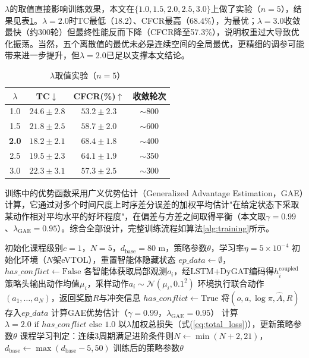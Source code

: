 \documentclass[12pt,a4paper,UTF8]{ctexart}
\begin{document}
$\lambda$的取值直接影响训练效果，本文在$\{1.0, 1.5, 2.0, 2.5, 3.0\}$上做了实验（$n=5$），结果见表\ref{tab:lambda}。$\lambda=2.0$时TC最低（18.2）、CFCR最高（68.4\%），为最优；$\lambda=3.0$收敛最快（约300轮）但最终性能反而下降（CFCR降至57.3\%），说明权重过大导致优化振荡。当然，五个离散值的最优未必是连续空间的全局最优，更精细的调参可能带来进一步提升，但$\lambda=2.0$已足以支撑本文结论。

\begin{table}[H]
    \centering
    \caption{$\lambda$取值实验（$n=5$）}
    \label{tab:lambda}
    \begin{tabular}{|c|c|c|c|}
        \hline
        $\lambda$ & TC$\downarrow$ & CFCR(\%)$\uparrow$ & 收敛轮次 \\
        \hline
        1.0 & $24.6\pm2.8$ & $53.2\pm2.3$ & $\sim800$ \\
        1.5 & $21.8\pm2.5$ & $58.7\pm2.0$ & $\sim600$ \\
        \textbf{2.0} & $\mathbf{18.2\pm2.1}$ & $\mathbf{68.4\pm1.8}$ & $\sim400$ \\
        2.5 & $19.5\pm2.3$ & $64.1\pm1.9$ & $\sim350$ \\
        3.0 & $22.3\pm3.1$ & $57.3\pm2.5$ & $\sim300$ \\
        \hline
    \end{tabular}
\end{table}

训练中的优势函数采用广义优势估计（Generalized Advantage Estimation，GAE）\cite{ref38}计算，它通过对多个时间尺度上时序差分误差的加权平均估计"在给定状态下采取某动作相对平均水平的好坏程度"，在偏差与方差之间取得平衡（本文取$\gamma=0.99$、$\lambda_{\text{GAE}}=0.95$）。综合全部设计，完整训练流程如算法\ref{alg:training}所示。

\begin{algorithm}[H]
\caption{基于DyGAT-MARL的协同管控模型训练流程}
\label{alg:training}
\begin{algorithmic}[1]
\STATE 初始化课程级别$c=1$，$N=5$，$d_{\text{base}}=80$ m，策略参数$\theta$，学习率$\eta=5\times10^{-4}$
    \STATE 初始化环境（$N$架eVTOL），重置智能体隐藏状态
    \STATE $ep\_data \leftarrow \emptyset$，$has\_conflict \leftarrow \text{False}$
    \REPEAT
        \STATE 各智能体获取局部观测$o_i$，经LSTM+DyGAT编码得$h_i^{\text{coupled}}$
        \STATE 策略头输出动作均值$\mu_i$，采样动作$a_i\sim\mathcal{N}(\mu_i,0.1^2)$
        \STATE 环境执行联合动作$(a_1,\ldots,a_N)$，返回奖励$R$与冲突信息
         \STATE $has\_conflict \leftarrow \text{True}$ \ENDIF
        \STATE 将$(o,a,\log\pi,\hat{A},R)$存入$ep\_data$
    \STATE 计算GAE\cite{ref38}优势估计（$\gamma=0.99$，$\lambda_{\text{GAE}}=0.95$）
    \STATE 计算$\lambda = 2.0 \text{ if } has\_conflict \text{ else } 1.0$
    \STATE 以$\lambda$加权总损失（式(\ref{eq:total_loss})），更新策略参数$\theta$
    \STATE 课程学习判定：连续3周期满足进阶条件则$N\leftarrow\min(N+2,21)$，$d_{\text{base}}\leftarrow\max(d_{\text{base}}-5,50)$
\ENDFOR
\STATE \RETURN 训练后的策略参数$\theta$
\end{algorithmic}
\end{algorithm}
\end{document}
